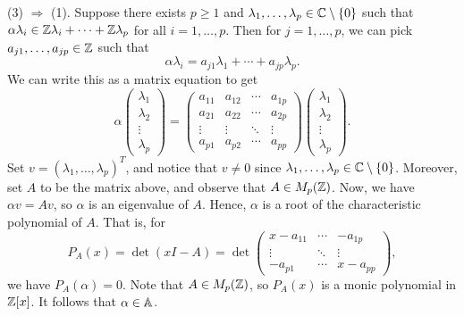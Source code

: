 \begin{pf}
    (3) $\Rightarrow$ (1). Suppose there exists $p \geq 1$ and $\lambda_1, 
    \dots, \lambda_p \in \mathbb{C} \setminus \{0\}$ such that 
    $\alpha\lambda_i \in \mathbb{Z}\lambda_i + \cdots + \mathbb{Z}\lambda_p$ for all $i = 
    1, \dots, p$. Then for $j = 1, \dots, p$, we can pick $a_{j1}, \dots, 
    a_{jp} \in \mathbb{Z}$ such that 
    \[ \alpha\lambda_i = a_{j1} \lambda_1 + \cdots + a_{jp} \lambda_p. \] 
    We can write this as a matrix equation to get 
    \[ \alpha \begin{pmatrix}
        \lambda_1 \\ \lambda_2 \\ \vdots \\ \lambda_p 
    \end{pmatrix} = \begin{pmatrix}
        a_{11} & a_{12} & \cdots & a_{1p} \\ 
        a_{21} & a_{22} & \cdots & a_{2p} \\
        \vdots & \vdots & \ddots & \vdots \\ 
        a_{p1} & a_{p2} & \cdots & a_{pp}
    \end{pmatrix} \begin{pmatrix}
        \lambda_1 \\ \lambda_2 \\ \vdots \\ \lambda_p 
    \end{pmatrix}. \] 
    Set $v = (\lambda_1, \dots, \lambda_p)^T$, and notice that $v \neq 0$ 
    since $\lambda_1, \dots, \lambda_p \in \mathbb{C} \setminus \{0\}$. 
    Moreover, set $A$ to be the matrix above, and observe that $A \in M_p(\mathbb{Z})$. 
    Now, we have $\alpha v = Av$, so $\alpha$ is an eigenvalue of $A$. Hence, 
    $\alpha$ is a root of the characteristic polynomial of $A$. That is, for 
    \[ P_A(x) = \det(xI - A) = \det \begin{pmatrix}
        x - a_{11} & \cdots & -a_{1p} \\ 
        \vdots & \ddots & \vdots \\ 
        -a_{p1} & \cdots & x - a_{pp}
    \end{pmatrix}, \] 
    we have $P_A(\alpha) = 0$. Note that $A \in M_p(\mathbb{Z})$, so $P_A(x)$ is a 
    monic polynomial in $\mathbb{Z}[x]$. It follows that $\alpha \in \mathbb{A}$. \qedhere 
\end{pf}

